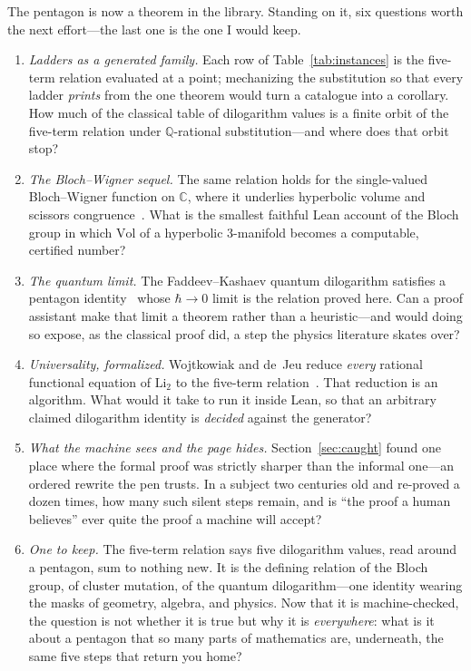 \documentclass[11pt]{article}
\newcommand{\Li}{\mathrm{Li}_2}
\begin{document}
The pentagon is now a theorem in the library. Standing on it, six questions worth the next
effort---the last one is the one I would keep.

\begin{enumerate}
\item \emph{Ladders as a generated family.} Each row of Table~\ref{tab:instances} is the
five-term relation evaluated at a point; mechanizing the substitution so that every ladder
\emph{prints} from the one theorem would turn a catalogue into a corollary. How much of the
classical table of dilogarithm values is a finite orbit of the five-term relation under
$\mathbb{Q}$-rational substitution---and where does that orbit stop?
\item \emph{The Bloch--Wigner sequel.} The same relation holds for the single-valued
Bloch--Wigner function on $\mathbb{C}$, where it underlies hyperbolic volume and scissors
congruence~\cite{suslin,neumannzagier,goncharov}. What is the smallest faithful Lean account
of the Bloch group in which $\mathrm{Vol}$ of a hyperbolic $3$-manifold becomes a computable,
certified number?
\item \emph{The quantum limit.} The Faddeev--Kashaev quantum dilogarithm satisfies a
pentagon identity~\cite{faddeevkashaev} whose $\hbar\to0$ limit is the relation proved here.
Can a proof assistant make that limit a theorem rather than a heuristic---and would doing so
expose, as the classical proof did, a step the physics literature skates over?
\item \emph{Universality, formalized.} Wojtkowiak and de~Jeu reduce \emph{every} rational
functional equation of $\Li$ to the five-term relation~\cite{wojtkowiak,dejeu}. That
reduction is an algorithm. What would it take to run it inside Lean, so that an arbitrary
claimed dilogarithm identity is \emph{decided} against the generator?
\item \emph{What the machine sees and the page hides.} Section~\ref{sec:caught} found one
place where the formal proof was strictly sharper than the informal one---an ordered rewrite
the pen trusts. In a subject two centuries old and re-proved a dozen times, how many such
silent steps remain, and is ``the proof a human believes'' ever quite the proof a machine
will accept?
\item \emph{One to keep.} The five-term relation says five dilogarithm values, read around a
pentagon, sum to nothing new. It is the defining relation of the Bloch group, of cluster
mutation, of the quantum dilogarithm---one identity wearing the masks of geometry, algebra,
and physics. Now that it is machine-checked, the question is not whether it is true but why
it is \emph{everywhere}: what is it about a pentagon that so many parts of mathematics are,
underneath, the same five steps that return you home?
\end{enumerate}
\end{document}
